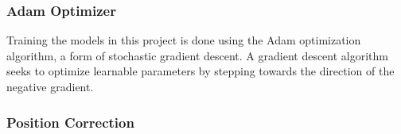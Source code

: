 \subsubsection{Adam Optimizer}
\label{sec:Method:ModelImplementation:Adam}
Training the models in this project is done using the Adam optimization algorithm, a form of stochastic gradient descent.
A gradient descent algorithm seeks to optimize learnable parameters by stepping towards the direction of the negative gradient.



\subsubsection{Position Correction}
\label{sec:Method:ModelImplementation:PositionCorrection}




